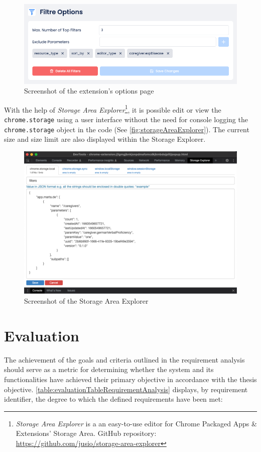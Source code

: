 \begin{figure}[H]
  \includegraphics[width=\textwidth]{assets/screenshot_filtre_options_page.png}
  \caption{Screenshot of the extension's options page}
  \label{fig:filtreOptionsPage}
\end{figure}

With the help of \emph{Storage Area Explorer}\footnote{\emph{Storage Area Explorer} is a an easy-to-use editor for Chrome Packaged Apps \& Extensions' Storage Area. GitHub repository: \url{https://github.com/jusio/storage-area-explorer}}, it is possible edit or view the \texttt{chrome.storage} using a user interface without the need for console logging the \texttt{chrome.storage} object in the code (See \autoref{fig:storageAreaExplorer}). The current size and size limit are also displayed within the Storage Explorer.

\begin{figure}[H]
  \includegraphics[width=\textwidth]{assets/screenschot_storage_area_explorer.png}
  \caption{Screenshot of the Storage Area Explorer}
  \label{fig:storageAreaExplorer}
\end{figure}

\section{Evaluation}
The achievement of the goals and criteria outlined in the requirement analysis should serve as a metric for determining whether the system and its functionalities have achieved their primary objective in accordance with the thesis objective. \autoref{table:evaluationTableRequirementAnalysis} displays, by requirement identifier, the degree to which the defined requirements have been met:

